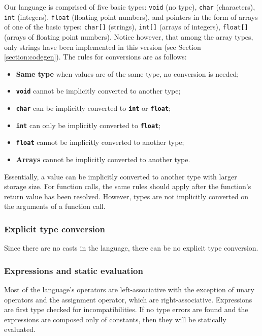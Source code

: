 Our language is comprised of five basic types:
\texttt{void} (no type), 
\texttt{char} (characters),
\texttt{int} (integers),
\texttt{float} (floating point numbers),
and pointers in the form of arrays of one of the basic types:
\texttt{char[]} (strings),
\texttt{int[]} (arrays of integers),
\texttt{float[]} (arrays of floating point numbers). Notice however, that among the array types,
only strings have been implemented in this version (see Section \ref{section:codegen}).
The rules for conversions are as follows:

\begin{itemize}
 \item \textbf{Same type} when values are of the same type, no conversion is needed;
 \item \textbf{\texttt{void}} cannot be implicitly converted to another type;
 \item \textbf{\texttt{char}} can be implicitly converted to \textbf{\texttt{int}} or \textbf{\texttt{float}};
 \item \textbf{\texttt{int}} can only be implicitly converted to \textbf{\texttt{float}};
 \item \textbf{\texttt{float}} cannot be implicitly converted to another type;
 \item \textbf{Arrays} cannot be implicitly converted to another type.
\end{itemize}

Essentially, a value can be implicitly converted to another type with larger storage size.
For function calls, the same rules should apply after the function's return value has been
resolved. However, types are not implicitly converted on the arguments of a function call.

\subsubsection{Explicit type conversion}

Since there are no casts in the language, there can be no explicit type conversion.

\subsubsection{Expressions and static evaluation}

Most of the language's operators are left-associative with the exception of unary operators
and the assignment operator, which are right-associative. Expressions are first type checked
for incompatibilities. If no type errors are found and the expressions
are composed only of constants, then they will be statically evaluated.


